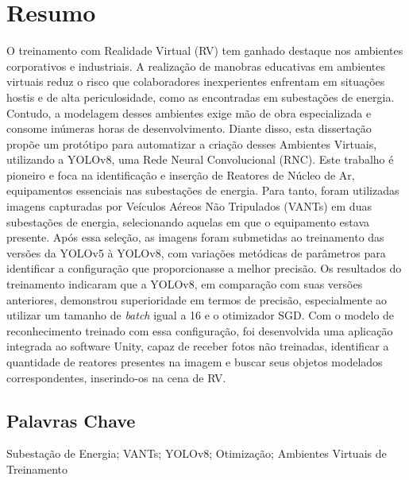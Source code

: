 \newpage
\thispagestyle{empty}
\chapter*{Resumo}
\vspace{-35pt}

O treinamento com Realidade Virtual (RV) tem ganhado destaque nos ambientes corporativos e industriais. A realização de manobras educativas em ambientes virtuais reduz o risco que colaboradores inexperientes enfrentam em situações hostis e de alta periculosidade, como as encontradas em subestações de energia. Contudo, a modelagem desses ambientes exige mão de obra especializada e consome inúmeras horas de desenvolvimento. Diante disso, esta dissertação propõe um protótipo para automatizar a criação desses Ambientes Virtuais, utilizando a YOLOv8, uma Rede Neural Convolucional (RNC). Este trabalho é pioneiro e foca na identificação e inserção de Reatores de Núcleo de Ar, equipamentos essenciais nas subestações de energia. Para tanto, foram utilizadas imagens capturadas por Veículos Aéreos Não Tripulados (VANTs) em duas subestações de energia, selecionando aquelas em que o equipamento estava presente. Após essa seleção, as imagens foram submetidas ao treinamento das versões da YOLOv5 à YOLOv8, com variações metódicas de parâmetros para identificar a configuração que proporcionasse a melhor precisão. Os resultados do treinamento indicaram que a YOLOv8, em comparação com suas versões anteriores, demonstrou superioridade em termos de precisão, especialmente ao utilizar um tamanho de \textit{batch} igual a 16 e o otimizador SGD. Com o modelo de reconhecimento treinado com essa configuração, foi desenvolvida uma aplicação integrada ao software Unity, capaz de receber fotos não treinadas, identificar a quantidade de reatores presentes na imagem e buscar seus objetos modelados correspondentes, inserindo-os na cena de RV.

\section*{Palavras Chave}
Subestação de Energia; VANTs; YOLOv8; Otimização; Ambientes Virtuais de Treinamento
\newpage


